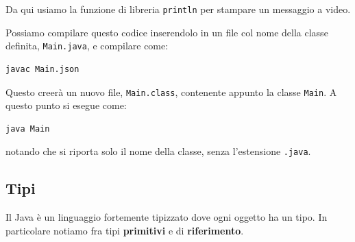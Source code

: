 \documentclass[a4paper,11pt]{article}
\begin{document}
Da qui usiamo la funzione di libreria \lstinline|println| per stampare un messaggio a video.

Possiamo compilare questo codice inserendolo in un file col nome della classe definita, \lstinline|Main.java|, e compilare come:
\begin{lstlisting}[style=shellstyle]
javac Main.json
\end{lstlisting}
Questo creerà un nuovo file, \lstinline|Main.class|, contenente appunto la classe \lstinline|Main|.
A questo punto si esegue come:
\begin{lstlisting}[style=shellstyle]
java Main
\end{lstlisting}
notando che si riporta solo il nome della classe, senza l'estensione \lstinline|.java|.

\subsection{Tipi}
Il Java è un linguaggio fortemente tipizzato dove ogni oggetto ha un tipo.
In particolare notiamo fra tipi \textbf{primitivi} e di \textbf{riferimento}.

\newpage
\end{document}
